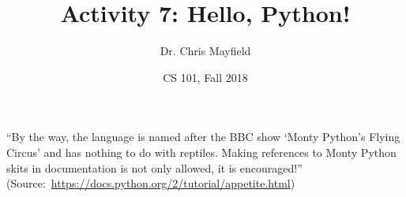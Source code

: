 \documentclass[12pt]{article}
\title{Activity 7: Hello, Python!}
\author{Dr. Chris Mayfield}
\date{CS 101, Fall 2018}
\begin{document}
\maketitle

``By the way, the language is named after the BBC show `Monty Python's Flying Circus' and has nothing to do with reptiles.
Making references to Monty Python skits in documentation is not only allowed, it is encouraged!''
(Source:~\url{https://docs.python.org/2/tutorial/appetite.html})



\end{document}
